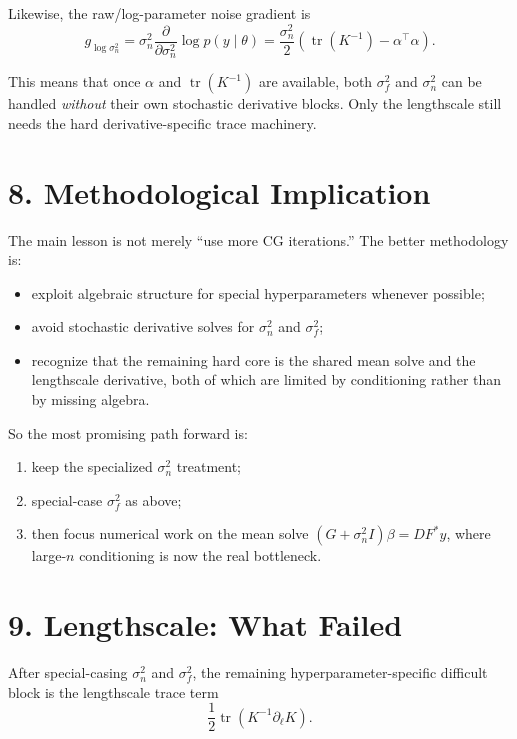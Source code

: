\documentclass[11pt]{article}
\begin{document}
Likewise, the raw/log-parameter noise gradient is
\begin{equation}
g_{\log \sigma_n^2}
=
\sigma_n^2 \frac{\partial}{\partial \sigma_n^2}\log p(y \mid \theta)
=
\frac{\sigma_n^2}{2}
\left(
\operatorname{tr}(K^{-1}) - \alpha^\top \alpha
\right).
\end{equation}

This means that once $\alpha$ and $\operatorname{tr}(K^{-1})$ are available,
both $\sigma_f^2$ and $\sigma_n^2$ can be handled \emph{without} their own
stochastic derivative blocks. Only the lengthscale still needs the hard
derivative-specific trace machinery.

\section*{8. Methodological Implication}

The main lesson is not merely ``use more CG iterations.'' The better
methodology is:
\begin{itemize}
  \item exploit algebraic structure for special hyperparameters whenever
  possible;
  \item avoid stochastic derivative solves for $\sigma_n^2$ and $\sigma_f^2$;
  \item recognize that the remaining hard core is the shared mean solve and the
  lengthscale derivative, both of which are limited by conditioning rather than
  by missing algebra.
\end{itemize}

So the most promising path forward is:
\begin{enumerate}[leftmargin=1.5em]
  \item keep the specialized $\sigma_n^2$ treatment;
  \item special-case $\sigma_f^2$ as above;
  \item then focus numerical work on the mean solve
  $(G + \sigma_n^2 I)\beta = D F^\ast y$, where large-$n$ conditioning is now
  the real bottleneck.
\end{enumerate}

\section*{9. Lengthscale: What Failed}

After special-casing $\sigma_n^2$ and $\sigma_f^2$, the remaining
hyperparameter-specific difficult block is the lengthscale trace term
\[
\frac{1}{2}\operatorname{tr}\!\left(K^{-1}\partial_\ell K\right).
\]
\end{document}
